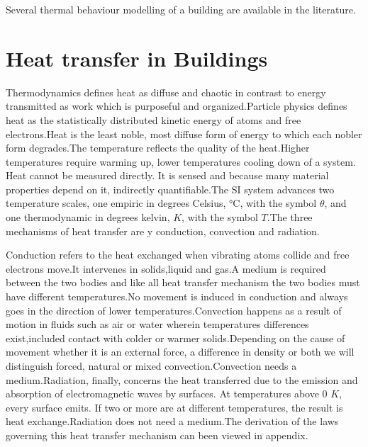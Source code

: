 \documentclass[a4paper,12pt]{article}
\numberwithin{equation}{section}
\begin{document}
Several thermal behaviour modelling of a building are available in the literature.



\newpage

\section{Heat transfer in Buildings}
Thermodynamics defines heat as diffuse and chaotic in contrast to energy transmitted as work which is purposeful and organized.Particle physics defines heat as the statistically distributed kinetic energy of atoms and free electrons.Heat is the least noble, most diffuse form of energy to which each nobler form degrades.The temperature reflects the quality of the heat.Higher temperatures require warming up, lower temperatures cooling down of a system. Heat cannot be
measured directly. It is sensed and because many material properties depend on it, indirectly quantifiable.The SI system advances two temperature scales, one empiric in degrees Celsius, °C,
with the symbol $\theta$, and one thermodynamic in degrees kelvin, $K$, with the symbol $T$.The three mechanisms of heat transfer are y conduction, convection and radiation.

Conduction refers to the heat exchanged when vibrating atoms collide and free electrons move.It intervenes in solids,liquid and gas.A medium is required between the two bodies and like all heat transfer mechanism the two bodies must have different temperatures.No movement is induced in conduction and always goes in the direction of lower temperatures.Convection happens as a result of motion in  fluids such as air or water wherein temperatures differences exist,included contact with colder or warmer solids.Depending on the cause of movement whether it is an external force, a difference in density or both we will distinguish forced, natural or mixed convection.Convection needs a medium.Radiation, finally, concerns the heat transferred due to the emission and absorption of electromagnetic waves by surfaces. At temperatures above 0 $K$, every surface emits. If two or more are at different temperatures, the result is heat exchange.Radiation does not need a medium.The derivation of the laws governing this heat transfer mechanism can been viewed in appendix.
\end{document}
